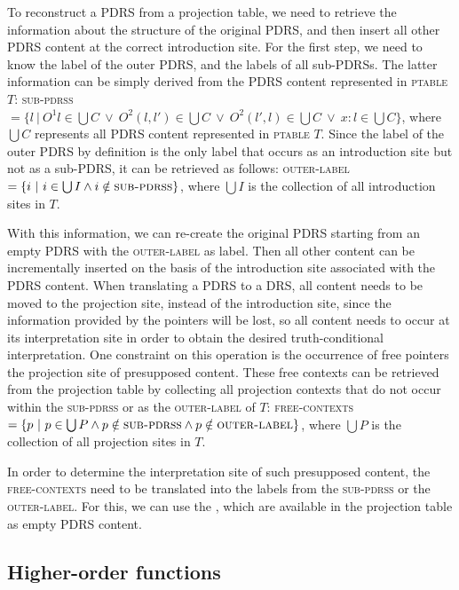 To reconstruct a PDRS from a projection table, we need to
retrieve the information about the structure of the original PDRS,
and then insert all other PDRS content at the correct introduction site. For
the first step, we need to know the label of the outer PDRS, and the labels
of all sub-PDRSs. The latter information can be simply derived from the PDRS
content represented in \textsc{ptable} $T$: \textsc{sub-pdrss} $=\{l~|~O^1
  l \in \bigcup C ~\vee~ O^2(l,l') \in \bigcup C ~\vee~ O^2(l',l) \in
\bigcup C ~\vee~ x:l \in \bigcup C \}$, where $\bigcup C$ represents all
PDRS content represented in \textsc{ptable} $T$. Since the label of the
outer PDRS by definition is the only label that occurs as an introduction
site but not as a sub-PDRS, it can be retrieved as follows:
\textsc{outer-label} $=\{i~|~i\in\bigcup I \wedge i \notin
\textsc{sub-pdrss}\}$, where $\bigcup I$ is the collection of all
introduction sites in $T$.

With this information, we can re-create the original PDRS starting from an
empty PDRS with the \textsc{outer-label} as label. Then all other content
can be incrementally inserted on the basis of the introduction site
associated with the PDRS content. When translating a PDRS to a DRS, all
content needs to be moved to the projection site, instead of the
introduction site, since the information provided by the pointers will be
lost, so all content needs to occur at its interpretation site in order to
obtain the desired truth-conditional interpretation. One constraint on this
operation is the occurrence of free pointers the projection site of
presupposed content. These free contexts can be retrieved from the
projection table by collecting all projection contexts that do not occur
within the \textsc{sub-pdrss} or as the \textsc{outer-label} of $T$:
\textsc{free-contexts} $=\{p~|~p\in\bigcup P \wedge p \notin
\textsc{sub-pdrss} \wedge p \notin \textsc{outer-label}\}$, where $\bigcup
P$ is the collection of all projection sites in $T$.

In order to determine the interpretation site of such presupposed content,
the \textsc{free-contexts} need to be translated into the labels from the
\textsc{sub-pdrss} or the \textsc{outer-label}. For this, we can use the
\MAPs, which are available in the projection table as empty PDRS content.

\subsection{Higher-order functions}
